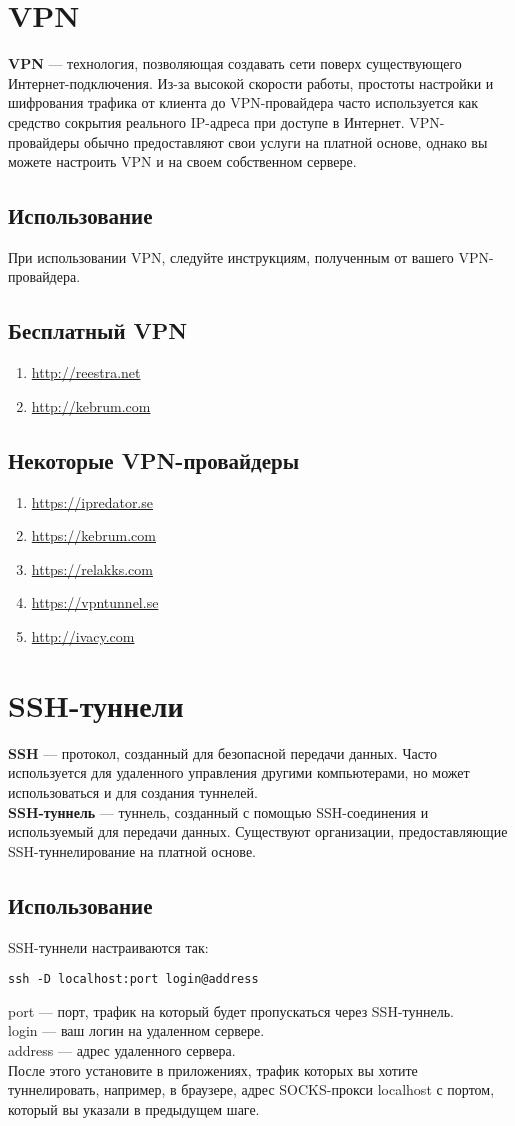 \section{VPN}
\textbf{VPN} --- технология, позволяющая создавать сети поверх существующего Интернет-подключения. Из-за высокой скорости работы, простоты настройки и шифрования трафика от клиента до VPN-провайдера часто используется как средство сокрытия реального IP-адреса при доступе в Интернет. VPN-провайдеры обычно предоставляют свои услуги на платной основе, однако вы можете настроить VPN и на своем собственном сервере.
\subsection{Использование}
При использовании VPN, следуйте инструкциям, полученным от вашего VPN-провайдера.
\subsection{Бесплатный VPN}
\begin{enumerate}
\item \url{http://reestra.net}
\item \url{http://kebrum.com}
\end{enumerate}
\subsection{Некоторые VPN-провайдеры}
\begin{enumerate}
\item \url{https://ipredator.se}
\item \url{https://kebrum.com}
\item \url{https://relakks.com}
\item \url{https://vpntunnel.se}
\item \url{http://ivacy.com}
\end{enumerate}
\section{SSH-туннели}
\textbf{SSH} --- протокол, созданный для безопасной передачи данных. Часто используется для удаленного управления другими компьютерами, но может использоваться и для создания туннелей.\\
\textbf{SSH-туннель} --- туннель, созданный с помощью SSH-соединения и используемый для передачи данных. Существуют организации, предоставляющие SSH-туннелирование на платной основе.
\subsection{Использование}
SSH-туннели настраиваются так:
\begin{lstlisting}
ssh -D localhost:port login@address
\end{lstlisting}
port --- порт, трафик на который будет пропускаться через SSH-туннель.\\
login --- ваш логин на удаленном сервере.\\
address --- адрес удаленного сервера.\\
После этого установите в приложениях, трафик которых вы хотите туннелировать, например, в браузере, адрес SOCKS-прокси localhost с портом, который вы указали в предыдущем шаге.
